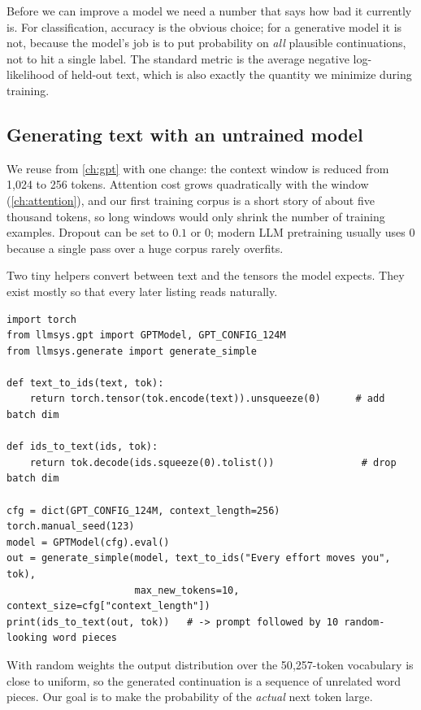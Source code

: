 Before we can improve a model we need a number that says how bad it currently is. For
classification, accuracy is the obvious choice; for a generative model it is not, because the
model's job is to put probability on \emph{all} plausible continuations, not to hit a single
label. The standard metric is the average negative log-likelihood of held-out text, which is
also exactly the quantity we minimize during training.

\subsection{Generating text with an untrained model}\label{sec:pretrain:untrained}

We reuse  from \cref{ch:gpt} with one change: the context window is reduced
from 1{,}024 to 256 tokens. Attention cost grows quadratically with the window
(\cref{ch:attention}), and our first training corpus is a short story of about five thousand
tokens, so long windows would only shrink the number of training examples. Dropout can be set
to $0.1$ or $0$; modern LLM pretraining usually uses $0$ because a single pass over a huge
corpus rarely overfits.

Two tiny helpers convert between text and the  tensors the model expects.
They exist mostly so that every later listing reads naturally.

\begin{lstlisting}[caption={Text $\leftrightarrow$ token-ID helpers and a first, meaningless generation.},label={lst:pretrain:helpers}]
import torch
from llmsys.gpt import GPTModel, GPT_CONFIG_124M
from llmsys.generate import generate_simple

def text_to_ids(text, tok):
    return torch.tensor(tok.encode(text)).unsqueeze(0)      # add batch dim

def ids_to_text(ids, tok):
    return tok.decode(ids.squeeze(0).tolist())               # drop batch dim

cfg = dict(GPT_CONFIG_124M, context_length=256)
torch.manual_seed(123)
model = GPTModel(cfg).eval()
out = generate_simple(model, text_to_ids("Every effort moves you", tok),
                      max_new_tokens=10, context_size=cfg["context_length"])
print(ids_to_text(out, tok))   # -> prompt followed by 10 random-looking word pieces
\end{lstlisting}

With random weights the output distribution over the 50{,}257-token vocabulary is close to
uniform, so the generated continuation is a sequence of unrelated word pieces. Our goal is to
make the probability of the \emph{actual} next token large.

